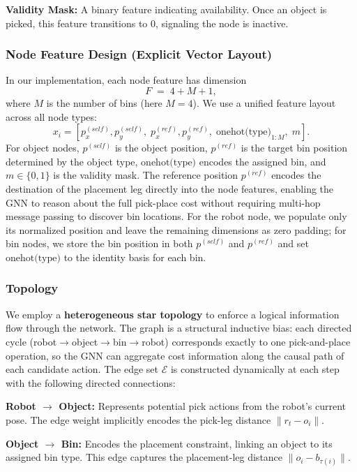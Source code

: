 \documentclass[conference]{IEEEtran}
\begin{document}
\textbf{Validity Mask:} A binary feature indicating availability. Once an object is picked, this feature transitions to $0$, signaling the node is inactive.

\subsubsection{Node Feature Design (Explicit Vector Layout)}
In our implementation, each node feature has dimension
\begin{equation}
F \;=\; 4 + M + 1,
\end{equation}
where $M$ is the number of bins (here $M=4$). 
We use a unified feature layout across all node types:
\begin{equation}
x_i = [p^{(self)}_x, p^{(self)}_y,\; p^{(ref)}_x, p^{(ref)}_y,\; \text{onehot(type)}_{1:M},\; m].
\end{equation}
For object nodes, $p^{(self)}$ is the object position, $p^{(ref)}$ is the target bin position determined by the object type, $\text{onehot(type)}$ encodes the assigned bin, and $m\in\{0,1\}$ is the validity mask. The reference position $p^{(ref)}$ encodes the destination of the placement leg directly into the node features, enabling the GNN to reason about the full pick-place cost without requiring multi-hop message passing to discover bin locations.
For the robot node, we populate only its normalized position and leave the remaining dimensions as zero padding; for bin nodes, we store the bin position in both $p^{(self)}$ and $p^{(ref)}$ and set $\text{onehot(type)}$ to the identity basis for each bin.

\subsubsection{Topology}
We employ a \textbf{heterogeneous star topology} to enforce a logical information flow through the network. The graph is a structural inductive bias: each directed cycle (robot$\to$object$\to$bin$\to$robot) corresponds exactly to one pick-and-place operation, so the GNN can aggregate cost information along the causal path of each candidate action. The edge set $\mathcal{E}$ is constructed dynamically at each step with the following directed connections:

\textbf{Robot $\to$ Object:} Represents potential pick actions from the robot's current pose. The edge weight implicitly encodes the pick-leg distance $\lVert r_t - o_i \rVert$.

\textbf{Object $\to$ Bin:} Encodes the placement constraint, linking an object to its assigned bin type. This edge captures the placement-leg distance $\lVert o_i - b_{\tau(i)} \rVert$.
\end{document}
